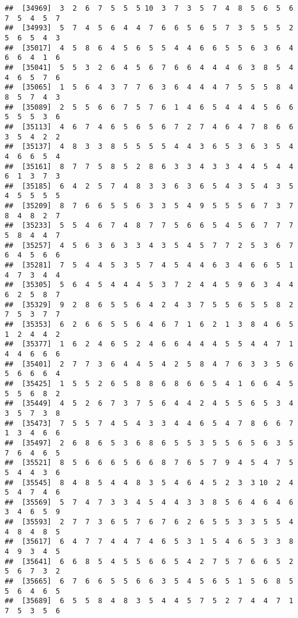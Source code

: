 \documentclass[
]{book}
\begin{document}
\begin{verbatim}
##  [34969]  3  2  6  7  5  5  5 10  3  7  3  5  7  4  8  5  6  5  6  7  5  4  5  7
##  [34993]  5  7  4  5  6  4  4  7  6  6  5  6  5  7  3  5  5  5  2  5  6  5  4  3
##  [35017]  4  5  8  6  4  5  6  5  5  4  4  6  6  5  5  6  3  6  4  6  6  4  1  6
##  [35041]  5  5  3  2  6  4  5  6  7  6  6  4  4  4  6  3  8  5  4  4  6  5  7  6
##  [35065]  1  5  6  4  3  7  7  6  3  6  4  4  4  7  5  5  5  8  4  8  5  7  4  3
##  [35089]  2  5  5  6  6  7  5  7  6  1  4  6  5  4  4  4  5  6  6  5  5  5  3  6
##  [35113]  4  6  7  4  6  5  6  5  6  7  2  7  4  6  4  7  8  6  6  3  5  4  2  2
##  [35137]  4  8  3  3  8  5  5  5  5  4  4  3  6  5  3  6  3  5  4  4  6  6  5  4
##  [35161]  8  7  7  5  8  5  2  8  6  3  3  4  3  3  4  4  5  4  4  6  1  3  7  3
##  [35185]  6  4  2  5  7  4  8  3  3  6  3  6  5  4  3  5  4  3  5  4  5  5  5  5
##  [35209]  8  7  6  6  5  5  6  3  3  5  4  9  5  5  5  6  7  3  7  8  4  8  2  7
##  [35233]  5  5  4  6  7  4  8  7  7  5  6  6  5  4  5  6  7  7  7  5  8  4  4  7
##  [35257]  4  5  6  3  6  3  3  4  3  5  4  5  7  7  2  5  3  6  7  6  4  5  6  6
##  [35281]  7  5  4  4  5  3  5  7  4  5  4  4  6  3  4  6  6  5  1  4  7  3  4  4
##  [35305]  5  6  4  5  4  4  4  5  3  7  2  4  4  5  9  6  3  4  4  6  2  5  8  7
##  [35329]  9  2  8  6  5  5  6  4  2  4  3  7  5  5  6  5  5  8  2  7  5  3  7  7
##  [35353]  6  2  6  6  5  5  6  4  6  7  1  6  2  1  3  8  4  6  5  1  2  4  4  2
##  [35377]  1  6  2  4  6  5  2  4  6  6  4  4  4  5  5  4  4  7  1  4  4  6  6  6
##  [35401]  2  7  7  3  6  4  4  5  4  2  5  8  4  7  6  3  3  5  6  5  6  6  6  4
##  [35425]  1  5  5  2  6  5  8  8  6  8  6  6  5  4  1  6  6  4  5  5  5  6  8  2
##  [35449]  4  5  2  6  7  3  7  5  6  4  4  2  4  5  5  6  5  3  4  3  5  7  3  8
##  [35473]  7  5  5  7  4  5  4  3  3  4  4  6  5  4  7  8  6  6  7  1  3  4  6  6
##  [35497]  2  6  8  6  5  3  6  8  6  5  5  3  5  5  6  5  6  3  5  7  6  4  6  5
##  [35521]  8  5  6  6  6  5  6  6  8  7  6  5  7  9  4  5  4  7  5  5  4  4  3  6
##  [35545]  8  4  8  5  4  4  8  3  5  4  6  4  5  2  3  3 10  2  4  5  4  7  4  6
##  [35569]  5  7  4  7  3  3  4  5  4  4  3  3  8  5  6  4  6  4  6  3  4  6  5  9
##  [35593]  2  7  7  3  6  5  7  6  7  6  2  6  5  5  3  3  5  5  4  4  8  4  8  5
##  [35617]  6  4  7  7  4  4  7  4  6  5  3  1  5  4  6  5  3  3  8  4  9  3  4  5
##  [35641]  6  6  8  5  4  5  5  6  6  5  4  2  7  5  7  6  6  5  2  5  6  7  3  2
##  [35665]  6  7  6  6  5  5  6  6  3  5  4  5  6  5  1  5  6  8  5  5  6  4  6  5
##  [35689]  6  5  5  8  4  8  3  5  4  4  5  7  5  2  7  4  4  7  1  7  5  3  5  6

\end{verbatim}
\end{document}
